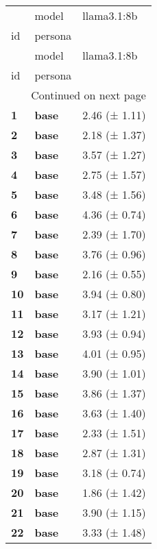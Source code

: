 \begin{longtable}{lll}
\toprule
 & model & llama3.1:8b \\
id & persona &  \\
\midrule
\endfirsthead
\toprule
 & model & llama3.1:8b \\
id & persona &  \\
\midrule
\endhead
\midrule
\multicolumn{3}{r}{Continued on next page} \\
\midrule
\endfoot
\bottomrule
\endlastfoot
\textbf{1} & \textbf{base} & 2.46 (± 1.11) \\
\cline{1-3}
\textbf{2} & \textbf{base} & 2.18 (± 1.37) \\
\cline{1-3}
\textbf{3} & \textbf{base} & 3.57 (± 1.27) \\
\cline{1-3}
\textbf{4} & \textbf{base} & 2.75 (± 1.57) \\
\cline{1-3}
\textbf{5} & \textbf{base} & 3.48 (± 1.56) \\
\cline{1-3}
\textbf{6} & \textbf{base} & 4.36 (± 0.74) \\
\cline{1-3}
\textbf{7} & \textbf{base} & 2.39 (± 1.70) \\
\cline{1-3}
\textbf{8} & \textbf{base} & 3.76 (± 0.96) \\
\cline{1-3}
\textbf{9} & \textbf{base} & 2.16 (± 0.55) \\
\cline{1-3}
\textbf{10} & \textbf{base} & 3.94 (± 0.80) \\
\cline{1-3}
\textbf{11} & \textbf{base} & 3.17 (± 1.21) \\
\cline{1-3}
\textbf{12} & \textbf{base} & 3.93 (± 0.94) \\
\cline{1-3}
\textbf{13} & \textbf{base} & 4.01 (± 0.95) \\
\cline{1-3}
\textbf{14} & \textbf{base} & 3.90 (± 1.01) \\
\cline{1-3}
\textbf{15} & \textbf{base} & 3.86 (± 1.37) \\
\cline{1-3}
\textbf{16} & \textbf{base} & 3.63 (± 1.40) \\
\cline{1-3}
\textbf{17} & \textbf{base} & 2.33 (± 1.51) \\
\cline{1-3}
\textbf{18} & \textbf{base} & 2.87 (± 1.31) \\
\cline{1-3}
\textbf{19} & \textbf{base} & 3.18 (± 0.74) \\
\cline{1-3}
\textbf{20} & \textbf{base} & 1.86 (± 1.42) \\
\cline{1-3}
\textbf{21} & \textbf{base} & 3.90 (± 1.15) \\
\cline{1-3}
\textbf{22} & \textbf{base} & 3.33 (± 1.48) \\

\end{longtable}
